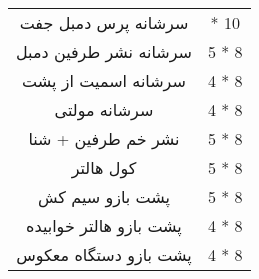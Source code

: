 \documentclass[12pt]{article}
\newcommand\myPadding{1.5}
\begin{document}
\begin{center}
  \bgroup
  \def\arraystretch{\myPadding}%
  \begin{tabular}{ c  c  }
سرشانه پرس دمبل جفت &
 { \quad 4 * 10 \quad } \\
سرشانه نشر طرفین دمبل &
 5 * 8 \\
سرشانه اسمیت از پشت &
 4 * 8 \\
سرشانه مولتی &
 4 * 8 \\
نشر خم طرفین + شنا &
 5 * 8 \\
کول هالتر &
 5 * 8 \\
پشت بازو سیم کش &
 5 * 8 \\
پشت بازو هالتر خوابیده &
 4 * 8 \\
پشت بازو دستگاه معکوس &
 4 * 8 \\ 
  \end{tabular}
  \egroup
\end{center}
\end{document}
